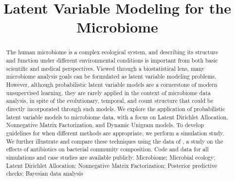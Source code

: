 \documentclass[oupdraft]{bio}
\begin{document}
\title{Latent Variable Modeling for the Microbiome}



\maketitle


\begin{abstract}
  {
    The human microbiome is a complex ecological system, and describing its
    structure and function under different environmental conditions is important
    from both basic scientific and medical perspectives. Viewed through a
    biostatistical lens, many microbiome analysis goals can be formulated as
    latent variable modeling problems. However, although probabilistic latent
    variable models are a cornerstone of modern unsupervised learning, they are
    rarely applied in the context of microbiome data analysis, in spite of the
    evolutionary, temporal, and count structure that could be directly
    incorporated through such models. We explore the application of
    probabilistic latent variable models to microbiome data, with a focus on
    Latent Dirichlet Allocation, Nonnegative Matrix Factorization, and Dynamic
    Unigram models. To develop guidelines for when different methods are
    appropriate, we perform a simulation study. We further illustrate and
    compare these techniques using the data of \cite{dethlefsen2011incomplete},
    a study on the effects of antibiotics on bacterial community composition.
    Code and data for all simulations and case studies are available publicly.}
  {
    Microbiome; Microbial ecology; Latent Dirichlet Allocation; Nonnegative
    Matrix Factorization; Posterior predictive checks; Bayesian data analysis
  }
\end{abstract}
\end{document}
